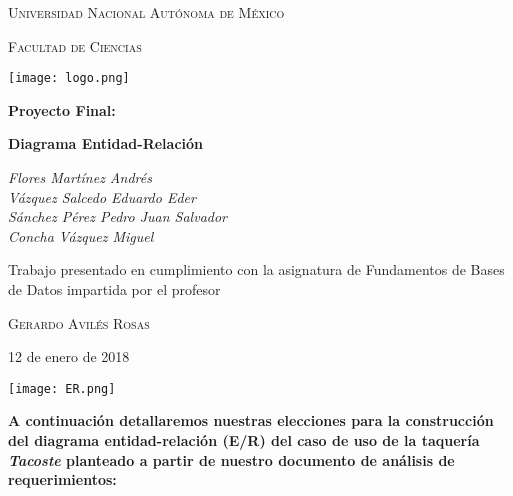 \documentclass[11pt,letterpaper]{article}
\begin{document}
\begin{titlepage}
	\centering
	{\scshape\LARGE Universidad Nacional Autónoma de México \par}
	\vspace{1cm}
	{\scshape\Large Facultad de Ciencias\par}
	\vspace{1.5cm}
\begin{center}
		\texttt{[image: logo.png]}
	\end{center}
		\vspace{.8 cm}

	{\huge\bfseries Proyecto Final: \par}
	{\huge\bfseries Diagrama Entidad-Relación \par}
		\vspace{0.5cm}

	{\Large\itshape Flores Martínez Andrés\\
	Vázquez Salcedo Eduardo Eder\\
	Sánchez Pérez Pedro Juan Salvador\\
	Concha Vázquez Miguel\par}
	\vfill
			\vspace{0.5cm}

	Trabajo presentado en cumplimiento con la asignatura de Fundamentos de Bases de Datos impartida por el profesor	\par
	 \textsc{Gerardo Avilés Rosas}\\
	\vspace{0.1cm}
	{\large 12 de enero de 2018\par}
\end{titlepage}



\newpage





\begin{landscape}

\begin{center}
\begin{minipage}{.8\linewidth}
\texttt{[image: ER.png]}
\end{minipage}
\end{center}

\end{landscape}


\newpage
\textbf{A continuación detallaremos nuestras elecciones para la construcción del diagrama entidad-relación (E/R) del caso de uso de la taquería \textit{Tacoste} planteado a partir de nuestro documento de análisis de requerimientos:}\\
\end{document}
